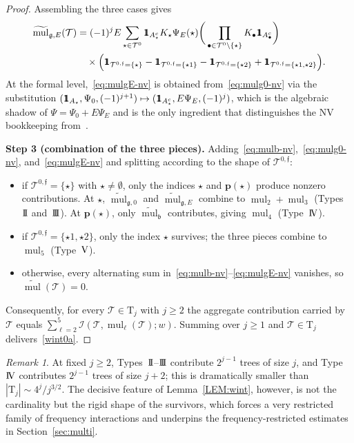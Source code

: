 \documentclass[a4paper,
11pt,  reqno]{amsart}
\newcommand{\mathbbm}[1]{\mathchoice%
    {\hbox{\sffamily 1\kern-.40em 1}}%
    {\hbox{\sffamily 1\kern-.40em 1}}%
    {\hbox{\scriptsize\sffamily 1\kern-.30em 1}}%
    {\hbox{\tiny\sffamily 1\kern-.25em 1}}}%
\newcommand{\II}{\textup{I \hspace{-2.9mm} I} }
\newcommand{\III}{\textup{I \hspace{-2.9mm} I \hspace{-2.9mm} I}}
\newcommand{\IV}{\textup{I \hspace{-2.9mm} V}}
\newcommand{\5}{\textup{V}}
\newcommand{\ind}{\mathbbm 1}
\newcommand{\wt}{\widetilde}
\theoremstyle{remark}
\newtheorem{remark}[theorem]{Remark}
\newcommand{\bul}{\bullet}
\newcommand{\TT}{\mathcal{T}}
\newcommand{\Tr}{\mathrm{T}}
\newcommand{\bfrak}{\mathfrak{b}}
\newcommand{\gfrak}{\mathfrak{g}}
\newcommand{\pb}{\mathbf{p}}
\newcommand{\ff}{\mathfrak{f}}
\DeclareMathOperator{\mul}{mul}
\newcommand{\Ical}{\mathcal{I}}
\numberwithin{equation}{section}
\numberwithin{theorem}{section}
\begin{document}
\begin{proof}
Assembling the three cases gives
\begin{align}
\label{eq:mulgE-nv}
\wt{\mul}_{\gfrak,E}(\TT)
&= (-1)^j E \sum_{\star\in \TT^0} \ind_{A_\star^c}K_\star\Psi_E(\star) \bigg(\prod_{\bul\in \TT^0\setminus\{\star\}}K_\bul\ind_{A_\bul^c}\bigg) \nonumber\\
&\quad \times\Big( \ind_{\TT^{0,\ff}=\{\star\}} - \ind_{\TT^{0,\ff}=\{\star1\}} - \ind_{\TT^{0,\ff}=\{\star2\}} + \ind_{\TT^{0,\ff}=\{\star1,\star2\}}\Big).
\end{align}
At the formal level,~\eqref{eq:mulgE-nv} is obtained from~\eqref{eq:mulg0-nv} via the substitution $(\ind_{A_\star},\Psi_0,(-1)^{j+1}) \mapsto (\ind_{A_\star^c}, E\Psi_E,(-1)^j)$, which is the algebraic shadow of $\Psi=\Psi_0+E\Psi_E$ and is the only ingredient that distinguishes the NV bookkeeping from~\cite[Lemma~2.10]{chcora}.

\medskip

\noindent\textbf{Step 3 (combination of the three pieces).}
Adding~\eqref{eq:mulb-nv},~\eqref{eq:mulg0-nv}, and~\eqref{eq:mulgE-nv} and splitting according to the shape of $\TT^{0,\ff}$:
\begin{itemize}
\item if $\TT^{0,\ff}=\{\star\}$ with $\star\neq \emptyset$, only the indices $\star$ and $\pb(\star)$ produce nonzero contributions. At $\star$, $\wt{\mul}_{\gfrak,0}$ and $\wt{\mul}_{\gfrak,E}$ combine to $\mul_2+\mul_3$ (Types~$\II$ and~$\III$). At $\pb(\star)$, only $\wt{\mul}_\bfrak$ contributes, giving $\mul_4$ (Type~$\IV$).
\item if $\TT^{0,\ff}=\{\star1,\star2\}$, only the index $\star$ survives; the three pieces combine to $\mul_5$ (Type~$\5$).
\item otherwise, every alternating sum in~\eqref{eq:mulb-nv}--\eqref{eq:mulgE-nv} vanishes, so $\wt{\mul}(\TT)=0$.
\end{itemize}
Consequently, for every $\TT\in \Tr_j$ with $j\ge 2$ the aggregate contribution carried by $\TT$ equals $\sum_{\ell=2}^5 \Ical(\TT,\mul_\ell(\TT);w)$. Summing over $j\ge 1$ and $\TT\in\Tr_j$ delivers~\eqref{wint0a}.
\end{proof}

\begin{remark}
At fixed $j\ge 2$, Types~$\II$--$\III$ contribute $2^{j-1}$ trees of size $j$, and Type~$\IV$ contributes $2^{j-1}$ trees of size $j+2$; this is dramatically smaller than $|\Tr_j|\sim 4^j/j^{3/2}$. The decisive feature of Lemma~\ref{LEM:wint}, however, is not the cardinality but the rigid shape of the survivors, which forces a very restricted family of frequency interactions and underpins the frequency-restricted estimates in Section~\ref{sec:multi}.
\end{remark}
\end{document}
